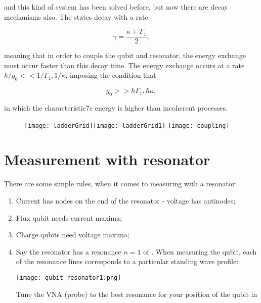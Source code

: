 \noindent and  this kind of  system has  been solved before,  but now
there are decay mechanisms also.  The states decay with a rate

\begin{equation}\label{ardecay}
  \gamma=\frac{\kappa+\Gamma_1}{2},
\end{equation}

\noindent meaning  that in order  to couple the qubit  and resonator,
the  energy exchange  must occur  faster than  this decay  time.  The
energy exchange occurs at a rate $ \hbar/g_0 << 1/\Gamma_1,1/\kappa$,
imposing the condition that

\begin{equation}\label{arD}
  g_0>>\hbar\Gamma_1,\hbar\kappa,
\end{equation}

\noindent  in  which  the  characteristic7c  energy  is  higher  than
incoherent processes.

\begin{figure}[h]
  \centering%
  \texttt{[image: ladderGrid]}\texttt{[image: ladderGrid1]}
  \texttt{[image: coupling]}
\end{figure}


\newpage
\section{Measurement with resonator}
\label{sec:meas-with-reson}

There  are some  simple  rules, when  it comes  to  measuring with  a
resonator:

\begin{framed}\noindent
  \begin{enumerate}
  \item Current has  nodes on the end of the  resonator - voltage has
    antinodes;
  \item Flux qubit needs current maxima;
  \item Charge qubits need voltage maxima;
  \item  Say   the  resonator  has  a   resonance  $  n  =   1  $  of
    .  When measuring the  qubit, each of the resonance
    lines corresponds to a particular standing wave profile:
    \begin{center}
      \texttt{[image: qubit\_resonator1.png]}
    \end{center}
    \noindent Tune  the VNA  (probe) to the  best resonance  for your
    position of the qubit in 
  \end{enumerate}
\end{framed}

